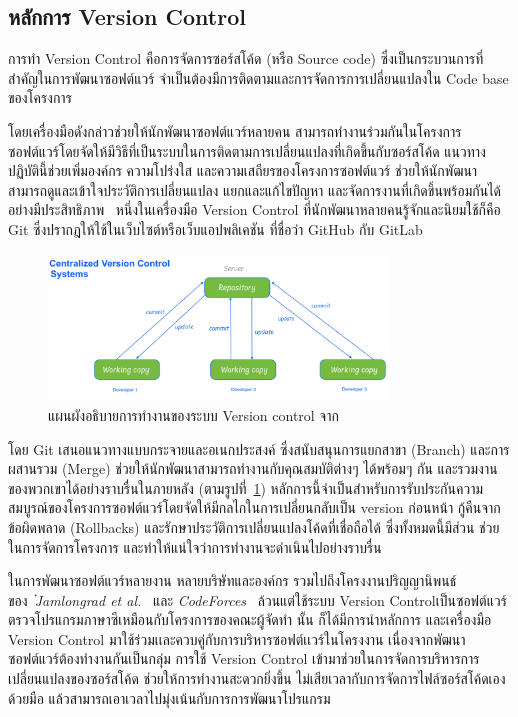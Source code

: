 \documentclass[12pt,one side,openright,a4paper]{cpe-thesis-th}
\newcommand{\thaijustify}[1]{%
  \par\hspace{30pt}\justifying
  #1
}
\begin{document}
\subsection{หลักการ Version Control}
\thaijustify{
  การทำ Version Control คือการจัดการซอร์สโค้ด (หรือ Source code) ซึ่งเป็นกระบวนการที่สำคัญในการพัฒนาซอฟต์แวร์ จำเป็นต้องมีการติดตามและการจัดการการเปลี่ยนแปลงใน Code base ของโครงการ~\cite{nattawat20pgs, rawat22versionctl}
}
\thaijustify{
  โดยเครื่องมือดังกล่าวช่วยให้นักพัฒนาซอฟต์แวร์หลายคน สามารถทำงานร่วมกันในโครงการซอฟต์แวร์โดยจัดให้มีวิธีที่เป็นระบบในการติดตามการเปลี่ยนแปลงที่เกิดขึ้นกับซอร์สโค้ด แนวทางปฏิบัตินี้ช่วยเพิ่มองค์กร ความโปร่งใส และความเสถียรของโครงการซอฟต์แวร์ ช่วยให้นักพัฒนาสามารถดูและเข้าใจประวัติการเปลี่ยนแปลง แยกและแก้ไขปัญหา และจัดการงานที่เกิดขึ้นพร้อมกันได้อย่างมีประสิทธิภาพ~\cite{rawat22versionctl} หนึ่งในเครื่องมือ Version Control ที่นักพัฒนาหลายคนรู้จักและนิยมใช้ก็คือ Git ซึ่งปรากฎให้ใช้ในเว็บไซต์หรือเว็บแอปพลิเคชัน ที่ชื่อว่า GitHub กับ GitLab~\cite{chacon14}
}
\begin{figure}[H]
  \centering
  \includegraphics[width=9cm]{figure/literature/version-control.png}
  \caption[แผนผังอธิบายการทำงานของระบบ Version control]{แผนผังอธิบายการทำงานของระบบ Version control จาก~\cite{rawat22versionctl}}
  \label{fig:version-control}
\end{figure}
\thaijustify{
  โดย Git เสนอแนวทางแบบกระจายและอเนกประสงค์ ซึ่งสนับสนุนการแยกสาขา (Branch) และการผสานรวม (Merge) ช่วยให้นักพัฒนาสามารถทำงานกับคุณสมบัติต่างๆ ได้พร้อมๆ กัน และรวมงานของพวกเขาได้อย่างราบรื่นในภายหลัง (ตามรูปที่~\ref{fig:version-control}) หลักการนี้จำเป็นสำหรับการรับประกันความสมบูรณ์ของโครงการซอฟต์แวร์โดยจัดให้มีกลไกในการเปลี่ยนกลับเป็น version ก่อนหน้า กู้คืนจากข้อผิดพลาด (Rollbacks) และรักษาประวัติการเปลี่ยนแปลงโค้ดที่เชื่อถือได้ ซึ่งทั้งหมดนี้มีส่วน ช่วยในการจัดการโครงการ และทำให้แน่ใจว่าการทำงานจะดำเนินไปอย่างราบรื่น
}
\thaijustify{
  ในการพัฒนาซอฟต์แวร์หลายงาน หลายบริษัทและองค์กร รวมไปถึงโครงงานปริญญานิพนธ์ของ~\textit{๋Jamlongrad et al.}~\cite{nattawat20pgs} และ \textit{CodeForces}~\cite{codeforces} ล้วนแต่ใช้ระบบ Version Controlเป็นซอฟต์แวร์ตรวจโปรแกรมภาษาซีเหมือนกับโครงการของคณะผู้จัดทำ นั้น ก็ได้มีการนำหลักการ และเครื่องมือ Version Control มาใช้ร่วมเเละควบคู่กับการบริหารซอฟต์เเวร์ในโครงงาน เนื่องจากพัฒนาซอฟต์แวร์ต้องทำงานกันเป็นกลุ่ม การใช้ Version Control เข้ามาช่วยในการจัดการบริหารการเปลี่ยนแปลงของซอร์สโค้ด ช่วยให้การทำงานสะดวกยิ่งขึ้น ไม่เสียเวลากับการจัดการไฟล์ซอร์สโค้ดเองด้วยมือ แล้วสามารถเอาเวลาไปมุ่งเน้นกับการการพัฒนาโปรแกรม
}
\end{document}

